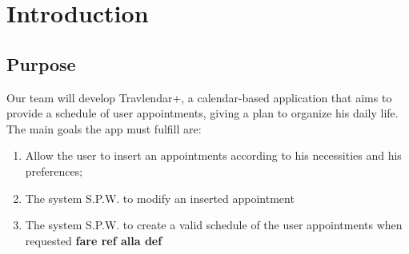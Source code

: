 \chapter{Introduction}

\section{Purpose}

Our team will develop Travlendar+, a calendar-based application that aims to provide a schedule of user appointments, giving a plan to organize his daily life.
The main goals the app must fulfill are:

\begin{enumerate}
\renewcommand\labelenumi{\textbf{G\theenumi}}

\item Allow the user to insert an appointments according to his necessities and his preferences;  \label{goal:G1}

\item The system S.P.W. to modify an inserted appointment 

\item The system S.P.W. to create a valid schedule of the user appointments when requested \textbf{fare ref alla def} \label{goal:G2}


\end{enumerate}
